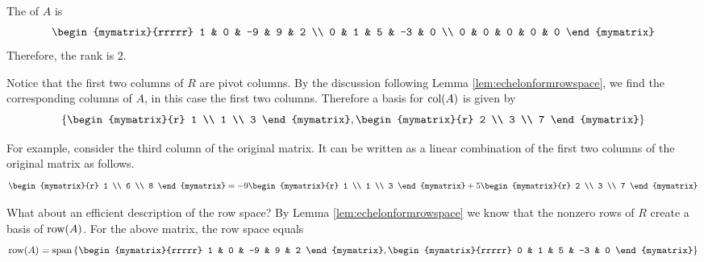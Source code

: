 \begin{solution}
The {\rref} of $A$ is 
\begin{equation*}
\begin{mymatrix}{rrrrr}
1 & 0 & -9 & 9 & 2 \\ 
0 & 1 & 5 & -3 & 0 \\ 
0 & 0 & 0 & 0 & 0
\end{mymatrix} 
\end{equation*}
Therefore, the rank is $2$.

Notice that the first two columns of $R$ are pivot columns. By the discussion following Lemma \ref{lem:echelonformrowspace}, we find the corresponding columns of $A$, in this case the first two columns. Therefore a basis for $\mbox{col}(A)$ is given by
\[
\set{\begin{mymatrix}{r}
1 \\ 
1 \\ 
3
\end{mymatrix} , \begin{mymatrix}{r}
2 \\ 
3 \\ 
7
\end{mymatrix}
}
\] 

 For
example, consider the third column of the original matrix. It can be written as a linear combination of the first two columns of the original matrix as follows.
\begin{equation*}
\begin{mymatrix}{r}
1 \\ 
6 \\ 
8
\end{mymatrix} =-9\begin{mymatrix}{r}
1 \\ 
1 \\ 
3
\end{mymatrix} +5\begin{mymatrix}{r}
2 \\ 
3 \\ 
7
\end{mymatrix} 
\end{equation*}

What about an efficient description of the row space? By Lemma \ref{lem:echelonformrowspace} we know that the nonzero rows of $R$ create a basis of $\mbox{row}(A)$.  For the above matrix, the row space equals 
\[
\func{row}(A) = 
\func{span} \set{
\begin{mymatrix}{rrrrr}
1 & 0 & -9 & 9 & 2
\end{mymatrix}, \begin{mymatrix}{rrrrr}
0 & 1 & 5 & -3 & 0
\end{mymatrix}
}
\]
\end{solution}

